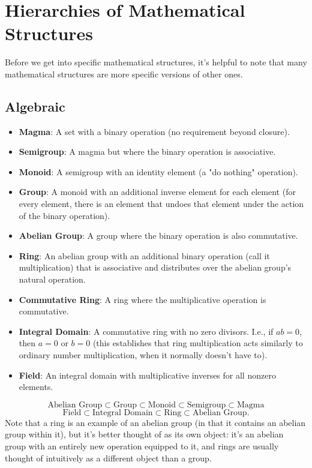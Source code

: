 \chapter{Hierarchies of Mathematical Structures}
Before we get into specific mathematical structures, it's helpful to note that many mathematical structures are more specific versions of other ones.
\section{Algebraic}
\begin{itemize}
	\item \textbf{Magma}: A set with a binary operation (no requirement beyond closure).
	\item \textbf{Semigroup}: A magma but where the binary operation is associative. 
	\item\textbf{Monoid}: A semigroup with an identity element (a "do nothing" operation).
	\item\textbf{Group}: A monoid with an additional inverse element for each element (for every element, there is an element that undoes that element under the action of the binary operation).
	\item\textbf{Abelian Group}: A group where the binary operation is also commutative.
	\item\textbf{Ring}: An abelian group with an additional binary operation (call it multiplication) that is associative and distributes over the abelian group's natural operation.
	\item\textbf{Commutative Ring}: A ring where the multiplicative operation is commutative.
	\item \textbf{Integral Domain}: A commutative ring with no zero divisors. I.e., if $ab = 0$, then $a=0$ or $b=0$ (this establishes that ring multiplication acts similarly to ordinary number multiplication, when it normally doesn't have to).
	\item \textbf{Field}: An integral domain with multiplicative inverses for all nonzero elements.
\end{itemize}
$$
	\text{Abelian Group}  \subset \text{Group}  \subset  \text{Monoid}  \subset  \text{Semigroup}  \subset  \text{Magma}
$$
$$
	\text{Field} \subset \text{Integral Domain} \subset \text{Ring}  \subset \text{Abelian Group}.
$$
Note that a ring is an example of an abelian group (in that it contains an abelian group within it), but it's better thought of as its own object: it's an abelian group with an entirely new operation equipped to it, and rings are usually thought of intuitively as a different object than a group.
